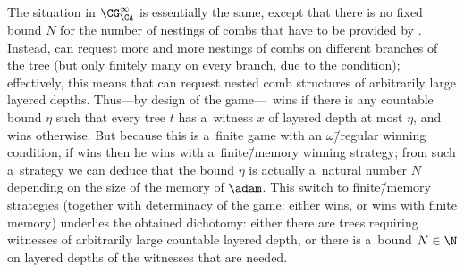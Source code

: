 The situation in $\CG^\infty_\CA$ is essentially the same, except that there is no fixed bound $N$ for the number of nestings of combs that have to be provided by \eve.
Instead, \adam can request more and more nestings of combs on different branches of the tree (but only finitely many on every branch, due to the  condition);
effectively, this means that \adam can request nested comb structures of arbitrarily large layered depths.
Thus---by design of the game---\adam~wins if there is any countable bound $\eta$ such that every tree $t$ has a~witness $x$ of layered depth at most $\eta$, and \eve wins otherwise.
But because this is a~finite game with an $\omega$\=/regular winning condition, if \adam wins then he wins with a~finite\=/memory winning strategy;
from such a~strategy we can deduce that the bound $\eta$ is actually a~natural number $N$ depending on the size of the memory of $\adam$.
This switch to finite\=/memory strategies (together with determinacy of the game: either \eve wins, or \adam wins with finite memory) underlies the obtained dichotomy:
either there are trees requiring witnesses of arbitrarily large countable layered depth, or there is a~bound $N\in\N$ on layered depths of the witnesses that are needed.


